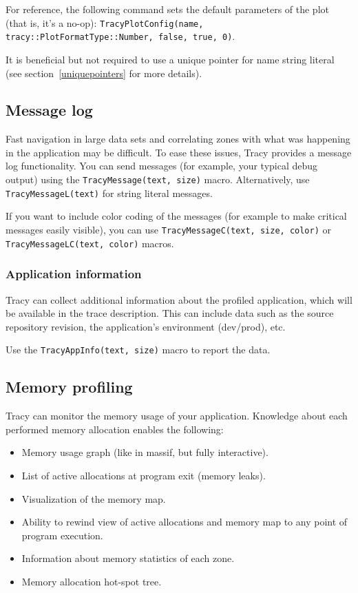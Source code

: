 \documentclass[hidelinks,titlepage,a4paper,twoside]{article}
\begin{document}
For reference, the following command sets the default parameters of the plot (that is, it's a no-op): \texttt{TracyPlotConfig(name, tracy::PlotFormatType::Number, false, true, 0)}.

It is beneficial but not required to use a unique pointer for name string literal (see section~\ref{uniquepointers} for more details).

\subsection{Message log}
\label{messagelog}

Fast navigation in large data sets and correlating zones with what was happening in the application may be difficult. To ease these issues, Tracy provides a message log functionality. You can send messages (for example, your typical debug output) using the \texttt{TracyMessage(text, size)} macro. Alternatively, use \texttt{TracyMessageL(text)} for string literal messages.

If you want to include color coding of the messages (for example to make critical messages easily visible), you can use \texttt{TracyMessageC(text, size, color)} or \texttt{TracyMessageLC(text, color)} macros.

\subsubsection{Application information}
\label{appinfo}

Tracy can collect additional information about the profiled application, which will be available in the trace description. This can include data such as the source repository revision, the application's environment (dev/prod), etc.

Use the \texttt{TracyAppInfo(text, size)} macro to report the data.

\subsection{Memory profiling}
\label{memoryprofiling}

Tracy can monitor the memory usage of your application. Knowledge about each performed memory allocation enables the following:

\begin{itemize}
\item Memory usage graph (like in massif, but fully interactive).
\item List of active allocations at program exit (memory leaks).
\item Visualization of the memory map.
\item Ability to rewind view of active allocations and memory map to any point of program execution.
\item Information about memory statistics of each zone.
\item Memory allocation hot-spot tree.
\end{itemize}
\end{document}
